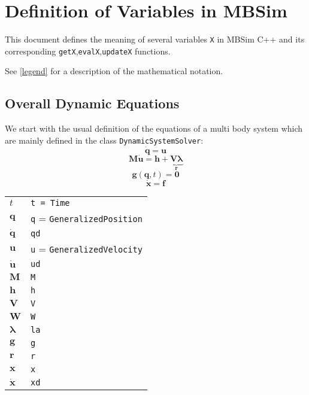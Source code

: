 \documentclass{article}
\newcommand{\bs}[1]{\boldsymbol #1}
\begin{document}
\section{Definition of Variables in MBSim}

This document defines the meaning of several variables \texttt{X} in MBSim C++ and its corresponding \texttt{getX},\texttt{evalX},\texttt{updateX} functions.

See \ref{legend} for a description of the mathematical notation.


\subsection{Overall Dynamic Equations}

We start with the usual definition of the equations of a multi body system which are mainly defined in the class \texttt{DynamicSystemSolver}:
\begin{equation}
  \dot{\bs{q}}=\bs{u}
\end{equation}
\begin{equation}
  \bs{M}\dot{\bs{u}}=\bs{h}+\underbrace{\bs{V}\bs{\lambda}}_{\bs{r}}
  \label{M}
\end{equation}
\begin{equation}
  \bs{g}(\bs{q},t)=\bs{0}
\end{equation}
\begin{equation}
  \dot{\bs{x}}=\bs{f}
\end{equation}

\begin{tabular}{|l|l|}
  \hline
  $t$ & \texttt{t = Time} \\
  $\bs{q}$ & \texttt{q} = \texttt{GeneralizedPosition} \\
  $\dot{\bs{q}}$ & \texttt{qd} \\
  $\bs{u}$ & \texttt{u} = \texttt{GeneralizedVelocity} \\
  $\dot{\bs{u}}$ & \texttt{ud} \\
  $\bs{M}$ & \texttt{M} \\
  $\bs{h}$ & \texttt{h} \\
  $\bs{V}$ & \texttt{V} \\
  $\bs{W}$ & \texttt{W} \\
  $\bs{\lambda}$ & \texttt{la} \\
  $\bs{g}$ & \texttt{g} \\
  $\bs{r}$ & \texttt{r} \\
  $\bs{x}$ & \texttt{x} \\
  $\dot{\bs{x}}$ & \texttt{xd} \\
  \hline
\end{tabular}
\end{document}
